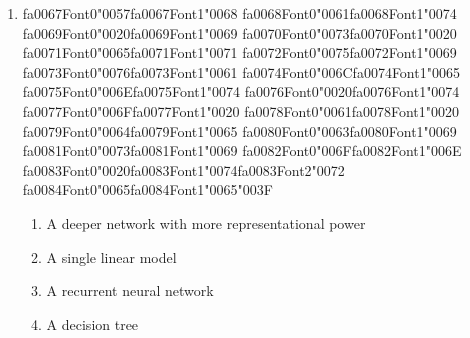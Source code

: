\documentclass[12pt]{article}
\begin{document}
\begin{enumerate}[label=Q\arabic*.]
\item {\csname fa0067Font0\endcsname\char"0057}{\csname fa0067Font1\endcsname\char"0068} {\csname fa0068Font0\endcsname\char"0061}{\csname fa0068Font1\endcsname\char"0074} {\csname fa0069Font0\endcsname\char"0020}{\csname fa0069Font1\endcsname\char"0069} {\csname fa0070Font0\endcsname\char"0073}{\csname fa0070Font1\endcsname\char"0020} {\csname fa0071Font0\endcsname\char"0065}{\csname fa0071Font1\endcsname\char"0071} {\csname fa0072Font0\endcsname\char"0075}{\csname fa0072Font1\endcsname\char"0069} {\csname fa0073Font0\endcsname\char"0076}{\csname fa0073Font1\endcsname\char"0061} {\csname fa0074Font0\endcsname\char"006C}{\csname fa0074Font1\endcsname\char"0065} {\csname fa0075Font0\endcsname\char"006E}{\csname fa0075Font1\endcsname\char"0074} {\csname fa0076Font0\endcsname\char"0020}{\csname fa0076Font1\endcsname\char"0074} {\csname fa0077Font0\endcsname\char"006F}{\csname fa0077Font1\endcsname\char"0020} {\csname fa0078Font0\endcsname\char"0061}{\csname fa0078Font1\endcsname\char"0020} {\csname fa0079Font0\endcsname\char"0064}{\csname fa0079Font1\endcsname\char"0065} {\csname fa0080Font0\endcsname\char"0063}{\csname fa0080Font1\endcsname\char"0069} {\csname fa0081Font0\endcsname\char"0073}{\csname fa0081Font1\endcsname\char"0069} {\csname fa0082Font0\endcsname\char"006F}{\csname fa0082Font1\endcsname\char"006E} {\csname fa0083Font0\endcsname\char"0020}{\csname fa0083Font1\endcsname\char"0074}{\csname fa0083Font2\endcsname\char"0072} {\csname fa0084Font0\endcsname\char"0065}{\csname fa0084Font1\endcsname\char"0065}{\char"003F}
\begin{enumerate}[label=(\Alph*)]
    \item A deeper network with more representational power
    \item A single linear model
    \item A recurrent neural network
    \item A decision tree
\end{enumerate}

\end{enumerate}
\end{document}
